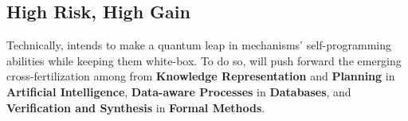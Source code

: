 











\subsection{High Risk, High Gain}

Technically, \project intends to make a quantum leap in
mechanisms' self-programming abilities while keeping them white-box. To do so,  \project will push forward the emerging cross-fertilization
among from \textbf{Knowledge
  Representation} and \textbf{Planning} in \textbf{Artificial Intelligence}, \textbf{Data-aware Processes} in \textbf{Databases}, and \textbf{Verification and Synthesis} in
\textbf{Formal Methods}. 

